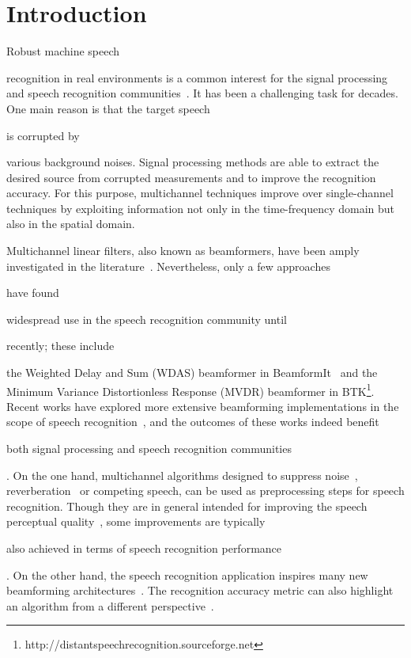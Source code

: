 \documentclass[review]{elsarticle}
\newif\ifproofread
\newcommand{\pfmarker}[1]{%
\ifproofread
\textcolor{red}{#1}%
\else
#1%
\fi
}
\begin{document}

\section{Introduction}

\pfmarker{Robust machine speech} recognition in real environments is a common interest for the signal processing and speech recognition communities~\cite{2014asr}. It has been a challenging task for decades. One main reason is that the target speech \pfmarker{is corrupted by} various background noises. Signal processing methods are able to extract the desired source from corrupted measurements and to improve the recognition accuracy. For this purpose, multichannel techniques improve over single-channel techniques by exploiting information not only in the time-frequency domain but also in the spatial domain. %

Multichannel linear filters, also known as beamformers, have been amply investigated in the literature~\cite{book2009benesty,book2013micarrays}. Nevertheless, only a few approaches \pfmarker{have found} widespread use in the speech recognition community until \pfmarker{recently; these include} the Weighted Delay and Sum (WDAS) beamformer in BeamformIt~\cite{2007beamformit} and the Minimum Variance Distortionless Response (MVDR) beamformer in BTK\footnote{http://distantspeechrecognition.sourceforge.net}. Recent works have explored more extensive beamforming implementations in the scope of speech recognition~\cite{2012micASR,2013reverb,2015chime3}, and the outcomes of these works indeed benefit \pfmarker{both signal processing and speech recognition communities}. On the one hand, multichannel algorithms designed to suppress noise~\cite{2001SEsharon}, reverberation~\cite{2012WPE} or competing speech, can be used as preprocessing steps for speech recognition. Though they are in general intended for improving the speech perceptual quality~\cite{2009hearaids}, some improvements are typically \pfmarker{also achieved in terms of speech recognition performance}. On the other hand, the speech recognition application inspires many new beamforming architectures~\cite{2016deepbeamforming,2016NAbf}. The recognition accuracy metric can also highlight an algorithm from a different perspective~\cite{2016icasspBLSTM}.
\end{document}
